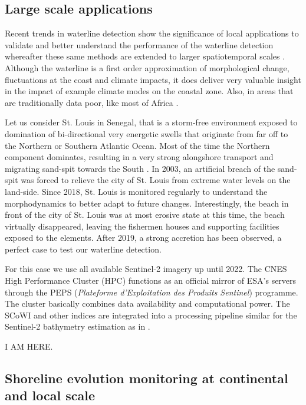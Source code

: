 \documentclass[remotesensing,article,submit,pdftex,moreauthors]{Definitions/mdpi}
\begin{document}
\subsection{Large scale applications}
Recent trends in waterline detection show the significance of local applications to validate and better understand the performance of the waterline detection whereafter these same methods are extended to larger spatiotemporal scales \citep{VOS2019_sub, almar2021global, Vos2023}. Although the waterline is a first order approximation of morphological change, fluctuations at the coast and climate impacts, it does deliver very valuable insight in the impact of example climate modes on the coastal zone. Also, in areas that are traditionally data poor, like most of Africa \citep{almar2022coastal}.  

Let us consider St. Louis in Senegal, that is a storm-free environment exposed to domination of bi-directional very energetic swells that originate from far off to the Northern or Southern Atlantic Ocean. Most of the time the Northern component dominates, resulting in a very strong alongshore transport and migrating sand-spit towards the South \citep{bergsma2020sand, taveneau2021observing}. In 2003, an artificial breach of the sand-spit was forced to relieve the city of St. Louis from extreme water levels on the land-side. Since 2018, St. Louis is monitored regularly to understand the morphodynamics to better adapt to future changes. Interestingly, the beach in front of the city of St. Louis was at most erosive state at this time, the beach virtually disappeared, leaving the fishermen houses and supporting facilities exposed to the elements. After 2019, a strong accretion has been observed, a perfect case to test our waterline detection. 

For this case we use all available Sentinel-2 imagery up until 2022. The CNES High Performance Cluster (HPC) functions as an official mirror of ESA's servers through the PEPS (\textit{Plateforme d'Exploitation des Produits Sentinel}) programme. The cluster basically combines data availability and computational power. The SCoWI and other indices are integrated into a processing pipeline similar for the Sentinel-2 bathymetry estimation as in \citet{daly2022new}. 



I AM HERE.




\subsection{Shoreline evolution monitoring at continental and local scale}
\end{document}
